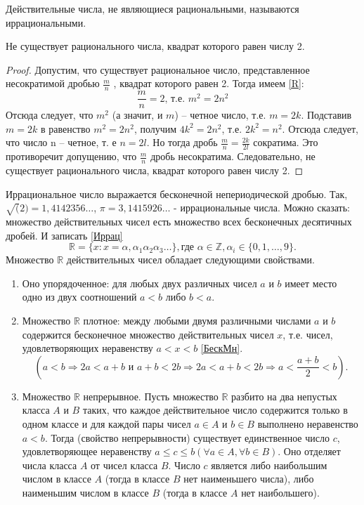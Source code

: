 Действительные числа, не являющиеся рациональными, называются иррациональными.
\begin{theorem}

Не существует рационального числа, квадрат которого равен числу 2.
\end{theorem}
\begin{proof}

Допустим, что существует рациональное число, представленное несократимой дробью $\frac{m}{n}$ , квадрат которого равен 2. Тогда имеем \eqref{R}:
\begin{equation}
\frac{{m}}{{n}}=2\text{, т.е. }{m}^2=2{n}^2\label{R}
\end{equation}
Отсюда следует, что $m^2$ (а значит, и $m$) – четное число, т.е. $m=2k$. Подставив $m=2k$ в равенство $m^2=2n^2$, получим $4k^2=2n^2$, т.е. $2k^2=n^2$. Отсюда следует, что число n – четное, т. е $n=2l$. Но тогда дробь $\frac{m}{n}=\frac{2k}{2l}$ сократима. Это противоречит допущению, что $\frac{m}{n}$ дробь несократима. Следовательно, не существует рационального числа, квадрат которого равен числу 2.
\end{proof}
Иррациональное число выражается бесконечной непериодической дробью. Так, $\sqrt(2)=1,4142356\ldots$, $\pi=3,1415926\ldots$ - иррациональные числа. Можно сказать: множество действительных чисел есть множество всех бесконечных десятичных дробей. И записать \eqref{Иррац}
\begin{equation}
\mathbb {R}=\{{x}: {x} = {\alpha},{\alpha_1\alpha_2\alpha_3}\ldots\},\text{где }{\alpha} \in \mathbb {Z}, \alpha_i \in \{0,1,\ldots,9\}.\label{Иррац}
\end{equation}
Множество $\mathbb {R}$ действительных чисел обладает следующими свойствами.
\begin{enumerate}
    \item Оно упорядоченное: для любых двух различных чисел $a$ и $b$ имеет место одно из двух соотношений $a<b$ либо $b<a$.
    \item Множество $\mathbb {R}$ плотное: между любыми двумя различными числами $a$ и $b$ содержится бесконечное множество действительных чисел $x$, т.е. чисел, удовлетворяющих неравенству $a<x<b$ \eqref{БескМн}.
\begin{equation}
({a}<{b} \Rightarrow 2{a}<{a}+{b} \text{ и } {a}+{b}<2{b} \Rightarrow 2{a}<{a}+{b}<2{b} \Rightarrow {a}<\frac{{a}+{b}}{2}<b).\label{БескМн}
\end{equation}
    \item Множество $\mathbb {R}$ непрерывное. Пусть множество $\mathbb {R}$ разбито на два непустых класса $A$ и $B$ таких, что каждое действительное число содержится только в одном классе и для каждой пары чисел $a \in A$ и $b \in B$ выполнено неравенство $a<b$. Тогда (свойство непрерывности) существует единственное число $c$, удовлетворяющее неравенству $a \leqslant c \leqslant b (\forall a \in A, \forall b \in B)$. Оно отделяет числа класса $A$ от чисел класса $B$. Число $c$ является либо наибольшим числом в классе $A$ (тогда в классе $B$ нет наименьшего числа), либо наименьшим числом в классе $B$ (тогда в классе $A$ нет наибольшего).
\end{enumerate}

